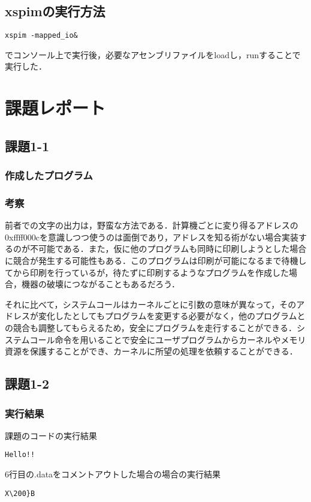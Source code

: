 \documentclass[a4j,11pt]{jarticle}
\begin{document}
\subsection{xspimの実行方法}
\begin{verbatim}
xspim -mapped_io&
\end{verbatim}
でコンソール上で実行後，必要なアセンブリファイルをloadし，runすることで実行した．
\section{課題レポート}

 \subsection{課題1-1}

  \subsubsection{作成したプログラム}

    
    

  \subsubsection{考察}
  
  前者での文字の出力は，野蛮な方法である．計算機ごとに変り得るアドレスの0xffff000cを意識しつつ使うのは面倒であり，アドレスを知る術がない場合実装するのが不可能である．また，仮に他のプログラムも同時に印刷しようとした場合に競合が発生する可能性もある．このプログラムは印刷が可能になるまで待機してから印刷を行っているが，待たずに印刷するようなプログラムを作成した場合，機器の破壊につながることもあるだろう．

それに比べて，システムコールはカーネルごとに引数の意味が異なって，そのアドレスが変化したとしてもプログラムを変更する必要がなく，他のプログラムとの競合も調整してもらえるため，安全にプログラムを走行することができる．システムコール命令を用いることで安全にユーザプログラムからカーネルやメモリ資源を保護することができ、カーネルに所望の処理を依頼することができる．

 \subsection{課題1-2}
\subsubsection{実行結果}
  \begin{screen}
    課題のコードの実行結果
    \end{screen}
    \begin{verbatim}
Hello!!
    \end{verbatim}
  \begin{screen}
    6行目の.dataをコメントアウトした場合の場合の実行結果
    \end{screen}
    \begin{verbatim}
X\200}B
    \end{verbatim}
\end{document}
